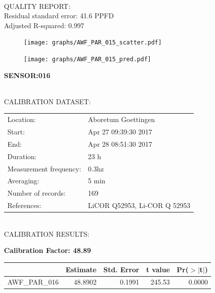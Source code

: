 \documentclass[oneside]{report}
\begin{document}
\hrulefill\\
QUALITY REPORT:\\
Residual standard error: 41.6 PPFD\\
Adjusted R-squared: 0.997



\begin{figure}[H]
  \centering
  \texttt{[image: graphs/AWF\_PAR\_015\_scatter.pdf]}
\end{figure}




\begin{figure}[H]
  \centering
  \texttt{[image: graphs/AWF\_PAR\_015\_pred.pdf]}
\end{figure}

\pagebreak


\begin{center}
\large{\textbf{SENSOR:016}}\\
\end{center}

\hrulefill\\
CALIBRATION DATASET:\\
\begin{table}[h!]
  \centering
  \label{tab:table1}
  \begin{tabular}{ll}
    Location: & Aboretum Goettingen\\ 
    
    
    Start:  & Apr 27 09:39:30 2017 \\
    End:   & Apr 28 08:51:30 2017\\ 
    Duration: & 23 h\\
    Measurement frequency: & 0.3hz\\
    Averaging:  &5 min\\
    Number of records: & 169 \\
    References: & LiCOR Q52953, Li-COR Q 52953 \\
  \end{tabular}
\end{table}

\hrulefill\\
CALIBRATION RESULTS:\\


\begin{center}
\textbf{\large{Calibration Factor: 48.89}}\\
\end{center}
\begin{table}[ht]
\centering
\begin{tabular}{rrrrr}
  \hline
 & Estimate & Std. Error & t value & Pr($>$$|$t$|$) \\ 
  \hline
AWF\_PAR\_016 & 48.8902 & 0.1991 & 245.53 & 0.0000 \\ 
   \hline
\end{tabular}
\end{table}
\end{document}
